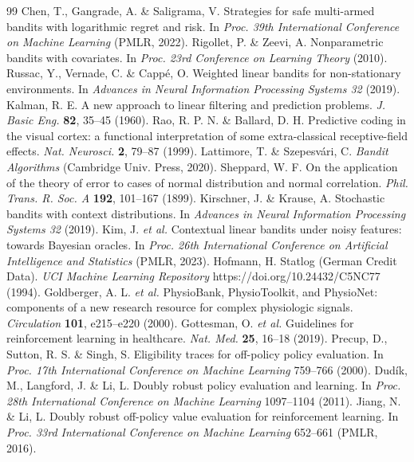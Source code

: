\documentclass[10pt,a4paper]{article}
\begin{document}
{\begin{thebibliography}{99}
 Chen, T., Gangrade, A. \& Saligrama, V. Strategies for safe multi-armed bandits with logarithmic regret and risk. In \emph{Proc. 39th International Conference on Machine Learning} (PMLR, 2022).
 Rigollet, P. \& Zeevi, A. Nonparametric bandits with covariates. In \emph{Proc. 23rd Conference on Learning Theory} (2010).
 Russac, Y., Vernade, C. \& Capp\'e, O. Weighted linear bandits for non-stationary environments. In \emph{Advances in Neural Information Processing Systems 32} (2019).
 Kalman, R. E. A new approach to linear filtering and prediction problems. \emph{J. Basic Eng.} \textbf{82}, 35--45 (1960).
 Rao, R. P. N. \& Ballard, D. H. Predictive coding in the visual cortex: a functional interpretation of some extra-classical receptive-field effects. \emph{Nat. Neurosci.} \textbf{2}, 79--87 (1999).
 Lattimore, T. \& Szepesv\'ari, C. \emph{Bandit Algorithms} (Cambridge Univ. Press, 2020).
 Sheppard, W. F. On the application of the theory of error to cases of normal distribution and normal correlation. \emph{Phil. Trans. R. Soc. A} \textbf{192}, 101--167 (1899).
 Kirschner, J. \& Krause, A. Stochastic bandits with context distributions. In \emph{Advances in Neural Information Processing Systems 32} (2019).
 Kim, J. \emph{et al.} Contextual linear bandits under noisy features: towards Bayesian oracles. In \emph{Proc. 26th International Conference on Artificial Intelligence and Statistics} (PMLR, 2023).
 Hofmann, H. Statlog (German Credit Data). \emph{UCI Machine Learning Repository} https://doi.org/10.24432/C5NC77 (1994).
 Goldberger, A. L. \emph{et al.} PhysioBank, PhysioToolkit, and PhysioNet: components of a new research resource for complex physiologic signals. \emph{Circulation} \textbf{101}, e215--e220 (2000).
 Gottesman, O. \emph{et al.} Guidelines for reinforcement learning in healthcare. \emph{Nat. Med.} \textbf{25}, 16--18 (2019).
 Precup, D., Sutton, R. S. \& Singh, S. Eligibility traces for off-policy policy evaluation. In \emph{Proc. 17th International Conference on Machine Learning} 759--766 (2000).
 Dud\'ik, M., Langford, J. \& Li, L. Doubly robust policy evaluation and learning. In \emph{Proc. 28th International Conference on Machine Learning} 1097--1104 (2011).
 Jiang, N. \& Li, L. Doubly robust off-policy value evaluation for reinforcement learning. In \emph{Proc. 33rd International Conference on Machine Learning} 652--661 (PMLR, 2016).

\end{thebibliography}}
\end{document}
